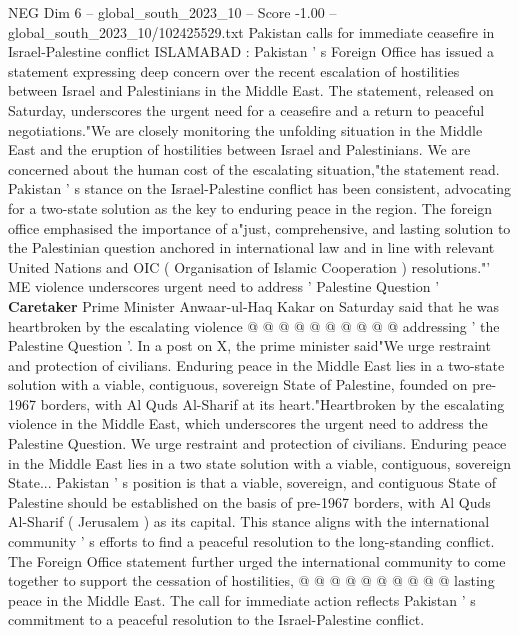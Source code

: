 \begin{textsample}{NEG Dim 6 – global\_south\_2023\_10 – Score -1.00 – global\_south\_2023\_10/102425529.txt}  \label{ex:f6_neg_147}
Pakistan calls for immediate ceasefire in Israel-Palestine conflict ISLAMABAD : Pakistan ' s Foreign Office has issued a statement expressing deep concern over the recent escalation of hostilities between Israel and Palestinians in the Middle East.
The statement, released on Saturday, underscores the urgent need for a ceasefire and a return to peaceful negotiations."We are closely monitoring the unfolding situation in the Middle East and the eruption of hostilities between Israel and Palestinians.
We are concerned about the human cost of the escalating situation,"the statement read.
Pakistan ' s stance on the Israel-Palestine conflict has been consistent, advocating for a two-state solution as the key to enduring peace in the region.
The foreign office emphasised the importance of a"just, comprehensive, and lasting solution to the Palestinian question anchored in international law and in line with relevant United Nations and OIC ( Organisation of Islamic Cooperation ) resolutions."' ME violence underscores urgent need to address ' Palestine Question ' \textbf{Caretaker} Prime Minister Anwaar-ul-Haq Kakar on Saturday said that he was heartbroken by the escalating violence @ @ @ @ @ @ @ @ @ @ addressing ' the Palestine Question '.
In a post on X, the prime minister said"We urge restraint and protection of civilians.
Enduring peace in the Middle East lies in a two-state solution with a viable, contiguous, sovereign State of Palestine, founded on pre-1967 borders, with Al Quds Al-Sharif at its heart."Heartbroken by the escalating violence in the Middle East, which underscores the urgent need to address the Palestine Question.
We urge restraint and protection of civilians.
Enduring peace in the Middle East lies in a two state solution with a viable, contiguous, sovereign State...
Pakistan ' s position is that a viable, sovereign, and contiguous State of Palestine should be established on the basis of pre-1967 borders, with Al Quds Al-Sharif ( Jerusalem ) as its capital.
This stance aligns with the international community ' s efforts to find a peaceful resolution to the long-standing conflict.
The Foreign Office statement further urged the international community to come together to support the cessation of hostilities, @ @ @ @ @ @ @ @ @ @ lasting peace in the Middle East.
The call for immediate action reflects Pakistan ' s commitment to a peaceful resolution to the Israel-Palestine conflict.

\end{textsample}
